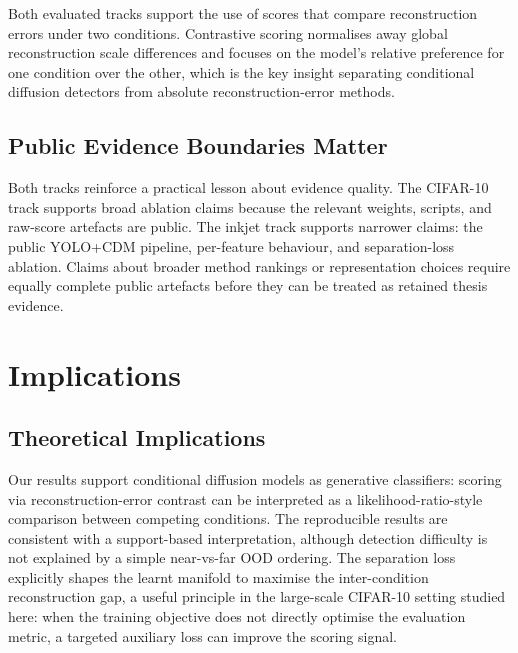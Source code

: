 Both evaluated tracks support the use of scores that compare
reconstruction errors under two conditions. Contrastive scoring
normalises away global reconstruction scale differences and focuses on
the model's relative preference for one condition over the other, which is the
key insight separating conditional diffusion detectors from absolute
reconstruction-error methods.

\subsection{Public Evidence Boundaries Matter}
\label{sec:disc:cross:public-evidence}

Both tracks reinforce a practical lesson about evidence quality. The
CIFAR-10 track supports broad ablation claims because the relevant
weights, scripts, and raw-score artefacts are public. The inkjet track
supports narrower claims: the public YOLO+CDM pipeline, per-feature
behaviour, and separation-loss ablation. Claims about broader method
rankings or representation choices require equally complete public
artefacts before they can be treated as retained thesis evidence.


\section{Implications}
\label{sec:disc:implications}

\subsection{Theoretical Implications}
\label{sec:disc:implications:theoretical}

Our results support conditional diffusion models as generative
classifiers: scoring via reconstruction-error contrast can be interpreted
as a likelihood-ratio-style comparison between competing conditions. The
reproducible results are consistent with a support-based interpretation,
although detection difficulty is not explained by a simple near-vs-far
OOD ordering. The separation loss explicitly shapes the learnt manifold
to maximise the inter-condition reconstruction gap, a useful principle in
the large-scale CIFAR-10 setting studied here: when the training
objective does not directly optimise the evaluation metric, a targeted
auxiliary loss can improve the scoring signal.

